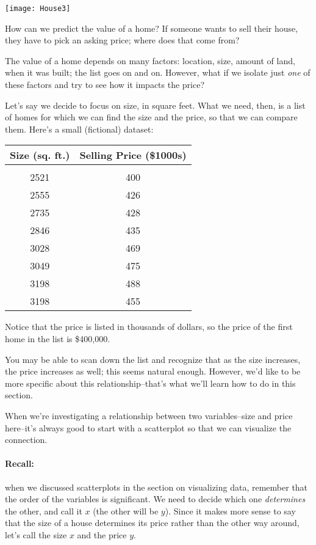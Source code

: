 \setcounter{ExampleCounter}{1}
\begin{center}
\texttt{[image: House3]}
\end{center}
How can we predict the value of a home?  If someone wants to sell their house, they have to pick an asking price; where does that come from?

The value of a home depends on many factors: location, size, amount of land, when it was built; the list goes on and on.  However, what if we isolate just \emph{one} of these factors and try to see how it impacts the price?

Let's say we decide to focus on size, in square feet.  What we need, then, is a list of homes for which we can find the size and the price, so that we can compare them.  Here's a small (fictional) dataset:
\begin{center}
\begin{tabular}{c c}
\textbf{Size (sq. ft.)} & \textbf{Selling Price (\$1000s)}\\
\hline
& \\
2521 & 400\\
2555 & 426\\
2735 & 428\\
2846 & 435\\
3028 & 469\\
3049 & 475\\
3198 & 488\\
3198 & 455\\
\end{tabular}
\end{center}
Notice that the price is listed in thousands of dollars, so the price of the first home in the list is \$400,000.

You may be able to scan down the list and recognize that as the size increases, the price increases as well; this seems natural enough.  However, we'd like to be more specific about this relationship--that's what we'll learn how to do in this section.

When we're investigating a relationship between two variables--size and price here--it's always good to start with a scatterplot so that we can visualize the connection.

\paragraph{Recall:} when we discussed scatterplots in the section on visualizing data, remember that the order of the variables is significant.  We need to decide which one \emph{determines} the other, and call it $x$ (the other will be $y$).  Since it makes more sense to say that the size of a house determines its price rather than the other way around, let's call the size $x$ and the price $y$.\\

